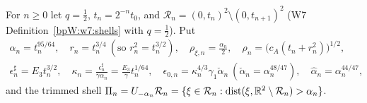 \begin{definition}[Shells]\label{bpW:w8:shells}
For $n\ge0$ let $q=\frac12$, $t_n=2^{-n}t_0$, and $\mathcal R_n=(0,t_n)^2\setminus(0,t_{n+1})^2$ (W7
Definition~\ref{bpW:w7:shells} with $q=\frac12$). Put
\begin{gather*}
\alpha_n=t_n^{95/64},\quad r_n=t_n^{3/4}\ (\text{so }r_n^2=t_n^{3/2}),\quad \rho_{\xi,n}=\frac{\alpha_n}2,\quad
\rho_n=\bigl(c_A(t_n+r_n^2)\bigr)^{1/2},\\
\epsilon^\sharp_n=E_3t_n^{3/2},\quad\kappa_n=\frac{\epsilon^\sharp_n}{\gamma\alpha_n}=\frac{E_3}{\gamma}t_n^{1/64},\quad
\epsilon_{0,n}=\kappa_n^{4/3}\gamma_1\check\alpha_n\ (\check\alpha_n=\alpha_n^{48/47}),\quad
\hat\alpha_n=\alpha_n^{44/47},
\end{gather*}
and the trimmed shell $\Pi_n=U_{-\alpha_n}\mathcal R_n=\{\xi\in\mathcal R_n:\operatorname{dist}(\xi,\mathbb{R}^2\setminus\mathcal R_n)>\alpha_n\}$.
\end{definition}

